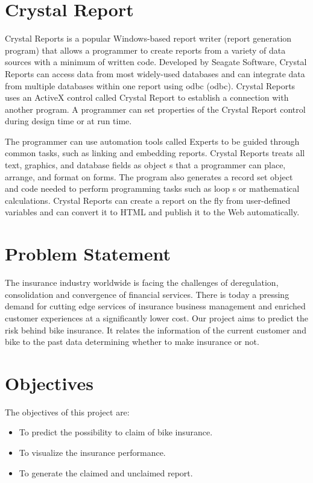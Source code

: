 \section{Crystal Report}
Crystal Reports is a popular Windows-based report writer (report generation program) that allows a programmer to create reports from a variety of data sources with a minimum of written code. Developed by Seagate Software, Crystal Reports can access data from most widely-used databases and can integrate data from multiple databases within one report using \acl{odbc} (\acs{odbc}). Crystal Reports uses an ActiveX control called Crystal Report to establish a connection with another program. A programmer can set properties of the Crystal Report control during design time or at run time.
\par
The programmer can use automation tools called Experts to be guided through common tasks, such as linking and embedding reports. Crystal Reports treats all text, graphics, and database fields as object s that a programmer can place, arrange, and format on forms. The program also generates a record set object and code needed to perform programming tasks such as loop s or mathematical calculations. Crystal Reports can create a report on the fly from user-defined variables and can convert it to HTML and publish it to the Web automatically. 

\section{Problem Statement}
The insurance industry worldwide is facing the challenges of deregulation, consolidation and convergence of financial services. There is today a pressing demand for cutting edge services of insurance business management and enriched customer experiences at a significantly lower cost. Our project aims to predict the risk behind bike insurance. It relates the information of the current customer and bike to the past data determining whether to make insurance or not.

\section{Objectives}\label{sec:obj}
The objectives of this project are:
\begin{itemize}
\item To predict the possibility to claim of bike insurance.
\item To visualize the insurance performance. 
\item To generate the claimed and unclaimed report.
\end{itemize}

